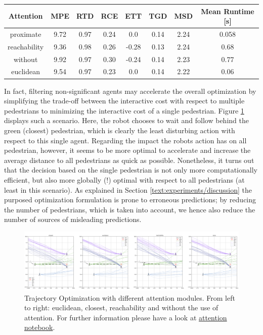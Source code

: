 \begin{table}[!ht]
\begin{center}
\begin{tabular}{c|c|c|c|c|c|c|c}
\bf Attention & \bf MPE & \bf RTD & \bf RCE & \bf ETT & \bf TGD & \bf MSD & \bf Mean Runtime [s] \\
\hline
proximate & 9.72 & 0.97 & 0.24 & 0.0 & 0.14 & 2.24 & 0.058 \\
\hline
reachability & 9.36 & 0.98 & 0.26 & -0.28 & 0.13 & 2.24 & 0.68 \\
\hline
\rowcolor{baseline_color}
without & 9.92 & 0.97 & 0.30 & -0.24 & 0.14 & 2.23 & 0.77 \\ 
\hline
\rowcolor{our_color}
euclidean & 9.54 & 0.97 & 0.23 & 0.0 & 0.14 & 2.22 & 0.06
\end{tabular}
\end{center}
\label{table:attention}
\end{table}

In fact, filtering non-significant agents may accelerate the overall optimization by simplifying the trade-off between the interactive cost with respect to multiple pedestrians to minimizing the interactive cost of a single pedestrian. Figure \ref{img:attention} displays such a scenario. Here, the robot chooses to wait and follow behind the green (closest) pedestrian, which is clearly the least disturbing action with respect to this single agent. Regarding the impact the robots action has on all pedestrian, however, it seems to be more optimal to accelerate and increase the average distance to all pedestrians as quick as possible. Nonetheless, it turns out that the decision based on the single pedestrian is not only more computationally efficient, but also more globally (!) optimal with respect to all pedestrians (at least in this scenario). As explained in Section \ref{text:experiments/discussion} the purposed optimization formulation is prone to erroneous predictions; by reducing the number of pedestrians, which is taken into account, we hence also reduce the number of sources of misleading predictions.

\begin{figure}[!ht]
\begin{center}
\includegraphics[width=\textwidth]{images/attention.png}
\caption{Trajectory Optimization with different attention modules. From left to right: euclidean, closest, reachability and without the use of attention. For further information please have a look at \href{https://github.com/simon-schaefer/mantrap/blob/master/examples/attention.ipynb}{attention notebook}.}
\end{center}
\label{img:attention}
\end{figure}
